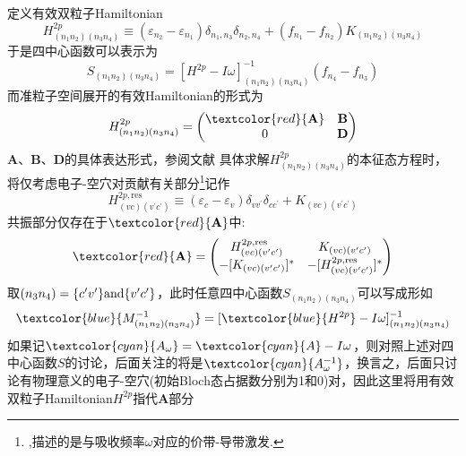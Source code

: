 {{{\begin{displaymath}
	\end{displaymath}
	定义有效双粒子\textrm{Hamiltonian}
	\begin{displaymath}
		H_{(n_1n_2)(n_3n_4)}^{2p}\equiv(\varepsilon_{n_2}-\varepsilon_{n_1})\delta_{n_1,n_3}\delta_{n_2,n_4}+(f_{n_1}-f_{n_2})K_{(n_1n_2)(n_3n_4)}
	\end{displaymath}
	于是四中心函数可以表示为
	\begin{displaymath}
		S_{(n_1n_2)(n_3n_4)}=[H^{2p}-I\omega]_{(n_1n_2)(n_3n_4)}^{-1}(f_{n_4}-f_{n_3})
	\end{displaymath} 
	而准粒子空间展开的有效\textrm{Hamiltonian}的形式为
	\begin{displaymath}
		H_{(n_1n_2)(n_3n_4)}^{2p}=
		\begin{pmatrix}
			\textcolor{red}{\mathbf{A}} &\mathbf{B}\\
			0 &\mathbf{D}
		\end{pmatrix}
	\end{displaymath}
	$\mathbf{A}$、$\mathbf{B}$、$\mathbf{D}$的具体表达形式，参阅文献\cite{RMP74-601_2002}
\vskip 3pt
具体求解$H_{(n_1n_2)(n_3n_4)}^{2p}$的本征态方程时，将仅考虑电子-空穴对贡献有关部分\footnote{\fontsize{6.5pt}{4.2pt},描述的是与吸收频率$\omega$对应的价带-导带激发.}记作
\begin{displaymath}
	H_{(vc)(v^{\prime}c^{\prime})}^{2p,\mathrm{res}}\equiv(\varepsilon_c-\varepsilon_v)\delta_{vv^{\prime}}\delta_{cc^{\prime}}+K_{(vc)(v^{\prime}c^{\prime})}
\end{displaymath}
共振部分仅存在于$\textcolor{red}{\mathbf{A}}$中:
\begin{displaymath}
	\textcolor{red}{\mathbf{A}}=
\begin{pmatrix}
	H_{(vc)(v^{\prime}c^{\prime})}^{2p,\mathrm{res}} &K_{(vc)(v^{\prime}c^{\prime})}\\
	-[K_{(vc)(v^{\prime}c^{\prime})}]^{\ast} &-[H_{(vc)(v^{\prime}c^{\prime})}^{2p,\mathrm{res}}]^{\ast}\\
\end{pmatrix}
\end{displaymath}
取$(n_3n_4)=\{c^{\prime}v^{\prime}\}\mbox{\textrm{and}}\{v^{\prime}c^{\prime}\}$，此时任意四中心函数$S_{(n_1n_2)(n_3n_4)}$可以写成形如
\begin{displaymath}
	\textcolor{blue}{M_{(n_1n_2)(n_3n_4)}^{-1}}=[\textcolor{blue}{H^{2p}}-I\omega]_{(n_1n_2)(n_3n_4)}^{-1}
\end{displaymath}
如果记$\textcolor{cyan}{A_{\omega}}=\textcolor{cyan}{A}-I\omega$，则对照上述对四中心函数$S$的讨论，后面关注的将是$\textcolor{cyan}{A_{\omega}^{-1}}$，换言之，后面只讨论有物理意义的电子-空穴(初始\textrm{Bloch}态占据数分别为1和0)对，因此这里将用有效双粒子\textrm{Hamiltonian}$H^{2p}$指代$\mathbf{A}$部分
}}}
